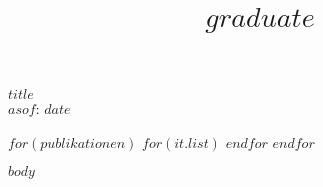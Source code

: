 \documentclass[a4paper,%
            11pt] %
            {moderncv} %
\title{$graduate$}
\begin{document}
\makecvtitle
\begin{center}
\Huge \textbf{$title$}\normalsize\\[2mm] $asof$: $date$
\end{center}
\bigskip
\nocite{*}

$for(publikationen)$
$for(it.list)$
\printbibliography[keyword={$it.key$}, title={$it.title$}]
$endfor$
$endfor$

$body$
\end{document}

